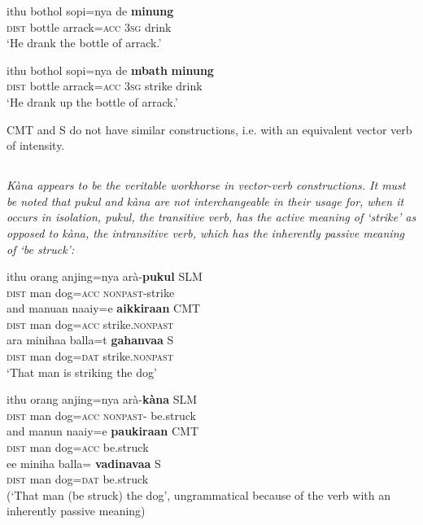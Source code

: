 \ea\label{jaffar:ex:27}
\gll ithu bothol sopi=nya de \textbf{minung} \\
 \textsc{dist} bottle arrack=\textsc{acc}  3\textsc{sg} drink \\
 `He drank the bottle of arrack.'
\z


\ea\label{jaffar:ex:28}
\gll ithu bothol sopi=nya de \textbf{mbath} \textbf{minung} \\
 \textsc{dist} bottle arrack=\textsc{acc}  3\textsc{sg} strike drink \\
 `He drank up the bottle of arrack.' 
\z

CMT and S do not have similar constructions, i.e. with an equivalent vector verb of intensity.

\subsection{}
\em Kàna \em appears to be the veritable workhorse in vector-verb constructions. 
It must be noted that \textit{pukul} and \textit{kàna} are not interchangeable in their usage for, when it occurs in isolation, \textit{pukul}, the transitive verb, has the active meaning of `strike' as opposed to \textit{kàna}, the intransitive verb, which has the inherently passive meaning of `be struck':

\ea\label{jaffar:ex:29}
\ea
\gll ithu orang anjing=nya arà-\textbf{pukul}  SLM \\
 \textsc{dist} man dog=\textsc{acc}  \textsc{nonpast}-strike\\
\ex%
\gll and{\E} manu{\textesh}an naaiy=e \textbf{a{\dz}ikkiraan} CMT \\
 \textsc{dist} man dog=\textsc{acc}  strike.\textsc{nonpast}\\
\ex%
\gll ara minihaa balla=t{\E} \textbf{gahan{\E}vaa}  S \\
 \textsc{dist} man dog=\textsc{dat} strike.\textsc{nonpast}\\
`That man is striking the dog'
\z
\z

\ea\label{jaffar:ex:32}
\ea
\gll *ithu orang anjing=nya arà-\textbf{kàna}  SLM \\
 \textsc{dist} man dog=\textsc{acc}  \textsc{nonpast}- be.struck \\
\ex
\gll *and{\E}  manu{\textesh}{\E}n naaiy=e \textbf{pa{\dz}ukiraan}  CMT \\
 \textsc{dist} man dog=\textsc{acc}  be.struck\\
\ex
\gll *ee miniha balla={\textrtailt}{\E} \textbf{vadinavaa}  S \\
 \textsc{dist} man dog=\textsc{dat}  be.struck\\
 (`That man (be struck) the dog', ungrammatical because of the verb with an inherently passive meaning)
\z
\z

